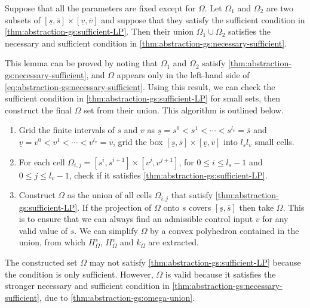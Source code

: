 \begin{lemma}
  \label{thm:abstraction-gs:omega-union}
  Suppose that all the parameters are fixed except for $\Omega$.
  Let $\Omega_{1}$ and $\Omega_{2}$ are two subsets of $[\underline{s}, \overbar{s}] \times[\underline{v}, \overbar{v}]$ and suppose that they satisfy the sufficient condition in \cref{thm:abstraction-gs:sufficient-LP}.
  Then their union $\Omega_{1} \cup \Omega_{2}$ satisfies the necessary and sufficient condition in \cref{thm:abstraction-gs:necessary-sufficient}.
\end{lemma}
This lemma can be proved by noting that $\Omega_{1}$ and $\Omega_{2}$ satisfy \cref{thm:abstraction-gs:necessary-sufficient}, and $\Omega$ appears only in the left-hand side of %
\cref{eq:abstraction-gs:necessary-sufficient}. %
Using this result, we can check the sufficient condition in \cref{thm:abstraction-gs:sufficient-LP} for small sets, then construct the final $\Omega$ set from their union.
This algorithm is outlined below.
\begin{enumerate}
\item %
  Grid the finite intervals of $s$ and $v$ as $\underline{s} = s^{0} < s^{1} < \cdots < s^{l_{s}} = \overbar{s}$ and $\underline{v} = v^{0} < v^{1} < \cdots < v^{l_{v}} = \overbar{v}$, \ie %
  grid the box $[\underline{s}, \overbar{s}] \times[\underline{v}, \overbar{v}]$ into $l_{s} l_{v}$ small cells.
\item For each cell $\Omega_{i,j} = [s^{i}, s^{i+1}] \times[v^{j}, v^{j+1}]$, for $0 \leqslant i \leqslant l_{s}-1$ and $0 \leqslant j \leqslant l_{v}-1$, check if it satisfies \cref{thm:abstraction-gs:sufficient-LP}.
\item Construct $\Omega$ as the union of all cells $\Omega_{i,j}$ that satisfy \cref{thm:abstraction-gs:sufficient-LP}.  If the projection of $\Omega$ onto $s$ covers %
  $[\underline{s}, \overbar{s}]$ then take $\Omega$.  This is to ensure that we can always find an admissible control input $v$ for any valid value of $s$.  We can simplify $\Omega$ by a convex polyhedron contained in the union, from which $H_{\Omega}^{s}$, $H_{\Omega}^{v}$ and $k_{\Omega}$ are extracted.
\end{enumerate}

\begin{remark}
  The constructed set $\Omega$ may not satisfy \cref{thm:abstraction-gs:sufficient-LP} because the condition is only sufficient.
  However, $\Omega$ is valid because it satisfies the stronger necessary and sufficient condition in \cref{thm:abstraction-gs:necessary-sufficient}, due to \cref{thm:abstraction-gs:omega-union}.
\end{remark}






